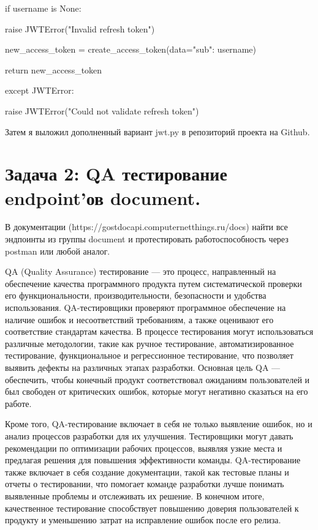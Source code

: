 \documentclass[a4paper,12pt]{article}
\begin{document}
\begin{description}
     	\item \hspace{20mm} if username is None:
         	\item \hspace{20mm} raise JWTError("Invalid refresh token")

     	\item \hspace{20mm} new\_access\_token = create\_access\_token(data={"sub": username})
     	\item \hspace{20mm} return new\_access\_token
 	\item \hspace{10mm} except JWTError:
     	\item \hspace{10mm} raise JWTError("Could not validate refresh token")
\end{description}
Затем я выложил дополненный вариант jwt.py в репозиторий проекта на Github.
\section*{Задача 2: QA тестирование endpoint’ов document. }
В документации (https://gostdocapi.computernetthings.ru/docs) найти все эндпоинты из группы document и протестировать работоспособность через postman или любой аналог.

QA (Quality Assurance) тестирование — это процесс, направленный на обеспечение качества программного продукта путем систематической проверки его функциональности, производительности, безопасности и удобства использования. QA-тестировщики проверяют программное обеспечение на наличие ошибок и несоответствий требованиям, а также оценивают его соответствие стандартам качества. В процессе тестирования могут использоваться различные методологии, такие как ручное тестирование, автоматизированное тестирование, функциональное и регрессионное тестирование, что позволяет выявить дефекты на различных этапах разработки. Основная цель QA — обеспечить, чтобы конечный продукт соответствовал ожиданиям пользователей и был свободен от критических ошибок, которые могут негативно сказаться на его работе.

Кроме того, QA-тестирование включает в себя не только выявление ошибок, но и анализ процессов разработки для их улучшения. Тестировщики могут давать рекомендации по оптимизации рабочих процессов, выявляя узкие места и предлагая решения для повышения эффективности команды. QA-тестирование также включает в себя создание документации, такой как тестовые планы и отчеты о тестировании, что помогает команде разработки лучше понимать выявленные проблемы и отслеживать их решение. В конечном итоге, качественное тестирование способствует повышению доверия пользователей к продукту и уменьшению затрат на исправление ошибок после его релиза.
\end{document}
